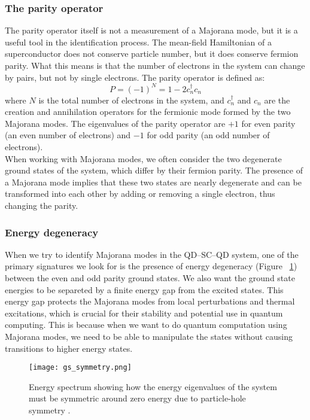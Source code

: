 \documentclass[11pt, letterpaper, titlepage]{article}
\begin{document}
\subsubsection{The parity operator}
The parity operator itself is not a measurement of a Majorana mode, but it is a useful tool in the identification process. The mean-field Hamiltonian of a superconductor does not conserve particle number, but it does conserve fermion parity. What this means is that the number of electrons in the system can change by pairs, but not by single electrons. The parity operator is defined as:
$$
P = (-1)^{N} = 1 - 2c_n ^{†} c_n
$$
where $N$ is the total number of electrons in the system, and $c_n^{†}$ and $c_n$ are the creation and annihilation operators for the fermionic mode formed by the two Majorana modes. The eigenvalues of the parity operator are $+1$ for even parity (an even number of electrons) and $-1$ for odd parity (an odd number of electrons).\\
When working with Majorana modes, we often consider the two degenerate ground states of the system, which differ by their fermion parity. The presence of a Majorana mode implies that these two states are nearly degenerate and can be transformed into each other by adding or removing a single electron, thus changing the parity.\\

\subsubsection{Energy degeneracy}
When we try to identify Majorana modes in the QD–SC–QD system, one of the primary signatures we look for is the presence of energy degeneracy (Figure ~\ref{fig:gs_symmetry}) between the even and odd parity ground states. We also want the ground state energies to be separeted by a finite energy gap from the excited states. This energy gap protects the Majorana modes from local perturbations and thermal excitations, which is crucial for their stability and potential use in quantum computing. This is because when we want to do quantum computation using Majorana modes, we need to be able to manipulate the states without causing transitions to higher energy states.\\
\begin{figure}
  \centering
  \texttt{[image: gs\_symmetry.png]}%
  \caption{Energy spectrum showing how the energy eigenvalues of the system must be symmetric around zero energy due to particle-hole symmetry \cite{Topocondmat}.}
  \label{fig:gs_symmetry}
\end{figure}
\newpage
\end{document}

